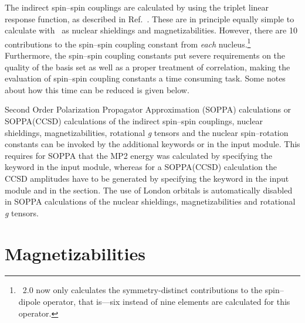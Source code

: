 The indirect spin--spin couplings are calculated by using the triplet linear
response function, as described in
Ref.~\cite{ovhapjhjajsbpthjcp96}.
These are in principle equally simple to calculate with \dalton\ as
nuclear shieldings and magnetizabilities. However, there are 10
contributions to the spin--spin coupling constant from {\em each}
nucleus.\footnote{\dalton\ 2.0 now only calculates the symmetry-distinct
  contributions to the spin--dipole operator, that is---six instead of
  nine elements are calculated for this operator.} Furthermore, the
spin--spin coupling constants put severe 
requirements on the quality of the basis set as well as a proper
treatment of correlation, making the evaluation of spin--spin coupling
constants a time consuming task. Some notes about how this time
can be reduced is given below.

Second Order Polarization Propagator Approximation (SOPPA)  
 calculations 
\cite{esnpjjodjcp73,jopjdycpr2,mjpekdtehjajjojcp,spascpl260,tejospastcan100}
or SOPPA(CCSD)  calculations
\cite{soppaccsd,spascpl260,tejospastcan100}  of the indirect spin--spin
couplings, nuclear shieldings, magnetizabilities, rotational {\em g} tensors
and the nuclear spin--rotation constants can be invoked by the additional
keywords  or  in the  input
module. This requires for SOPPA that the MP2 energy was calculated by
specifying the keyword  
in the  input module, whereas for a SOPPA(CCSD)
calculation the CCSD amplitudes have to be generated by specifying the
keyword  in the  input module and
 in the  section. The use of London orbitals is
automatically disabled in SOPPA calculations of the nuclear shieldings,
magnetizabilities and rotational {\em g} tensors. 

\section{Magnetizabilities}\label{sec:magnetizability}

